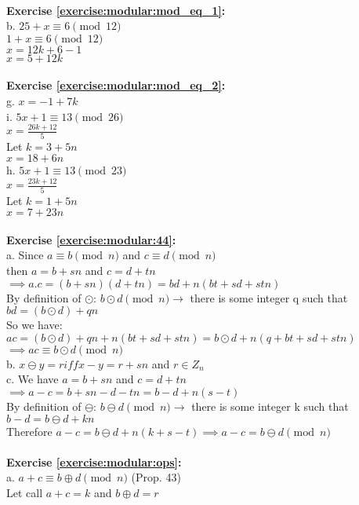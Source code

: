\\
\textbf{Exercise \ref{exercise:modular:mod_eq_1}:}\\
b. $25+x \equiv 6 \pmod{12}$\\
$1+x \equiv 6 \pmod{12}$\\
$x= 12k+6-1$\\
$x=5+12k$\\
\\
\textbf{Exercise \ref{exercise:modular:mod_eq_2}:}\\
g. $x=-1+7k$\\
i. $5x+1 \equiv 13 \pmod{26}$\\
$x= \displaystyle\frac{26k+12}{5}$\\
Let $k=3+5n$\\
$x=18+6n$\\
h. $5x+1 \equiv 13 \pmod{23}$\\
$x= \displaystyle\frac{23k+12}{5}$\\
Let $k=1+5n$\\
$x=7+23n$\\
\\
\textbf{Exercise \ref{exercise:modular:44}:}\\
a. Since $a \equiv b \pmod{n}$ and $c \equiv d \pmod{n}$\\
then $a=b+sn$ and $c=d+tn$\\
$\implies a.c =(b+sn)(d+tn)=bd+n(bt+sd+stn)$\\
By definition of $\odot$: $b \odot d \pmod{n} \to$ there is some integer q such that $bd=(b \odot d) +qn$\\
So we have: $ac=(b \odot d)+qn+n(bt+sd+stn)=b \odot d + n(q+bt+sd+stn)$\\
$\implies ac \equiv b \odot d \pmod{n}$\\
b. $x \ominus y=r iff x-y=r+sn$ and $r \in Z_n$\\
c. We have $a=b+sn$ and $c=d+tn$\\
$\implies a-c=b+sn-d-tn=b-d+n(s-t)$\\
By definition of $\ominus$: $b \ominus d \pmod{n} \to$ there is some integer k such that $b-d=b \ominus d +kn$\\
Therefore $a-c=b \ominus d +n(k+s-t) \implies a-c=b \ominus d \pmod{n}$\\
\\
\textbf{Exercise \ref{exercise:modular:ops}:}\\
a. $a+c \equiv b \oplus d \pmod{n}$ (Prop. 43)\\
Let call $a+c=k$ and $b \oplus d=r$\\

